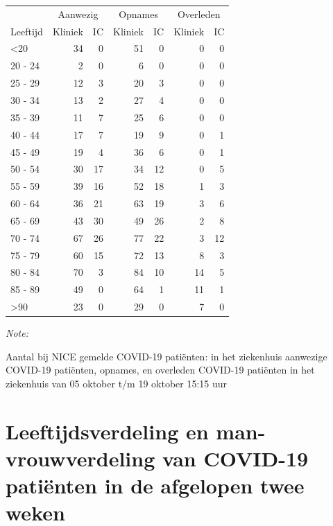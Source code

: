 \documentclass[
  english,
  man,floatsintext]{apa6}
\begin{document}
\begin{table}
\centering\begingroup\fontsize{10}{12}\selectfont

\begin{threeparttable}
\begin{tabular}{lrrrrrr}
\toprule
\multicolumn{1}{c}{ } & \multicolumn{2}{c}{Aanwezig} & \multicolumn{2}{c}{Opnames} & \multicolumn{2}{c}{Overleden} \\
\cmidrule(l{3pt}r{3pt}){2-3} \cmidrule(l{3pt}r{3pt}){4-5} \cmidrule(l{3pt}r{3pt}){6-7}
Leeftijd & Kliniek & IC & Kliniek & IC & Kliniek & IC\\
\midrule
<20 & 34 & 0 & 51 & 0 & 0 & 0\\
20 - 24 & 2 & 0 & 6 & 0 & 0 & 0\\
25 - 29 & 12 & 3 & 20 & 3 & 0 & 0\\
30 - 34 & 13 & 2 & 27 & 4 & 0 & 0\\
35 - 39 & 11 & 7 & 25 & 6 & 0 & 0\\
40 - 44 & 17 & 7 & 19 & 9 & 0 & 1\\
45 - 49 & 19 & 4 & 36 & 6 & 0 & 1\\
50 - 54 & 30 & 17 & 34 & 12 & 0 & 5\\
55 - 59 & 39 & 16 & 52 & 18 & 1 & 3\\
60 - 64 & 36 & 21 & 63 & 19 & 3 & 6\\
65 - 69 & 43 & 30 & 49 & 26 & 2 & 8\\
70 - 74 & 67 & 26 & 77 & 22 & 3 & 12\\
75 - 79 & 60 & 15 & 72 & 13 & 8 & 3\\
80 - 84 & 70 & 3 & 84 & 10 & 14 & 5\\
85 - 89 & 49 & 0 & 64 & 1 & 11 & 1\\
>90 & 23 & 0 & 29 & 0 & 7 & 0\\
\bottomrule
\end{tabular}
\begin{tablenotes}
\item \textit{Note: } 
\item Aantal bij NICE gemelde COVID-19 patiënten: in het ziekenhuis aanwezige COVID-19 patiënten, opnames, en overleden COVID-19 patiënten in het ziekenhuis van 05 oktober t/m 19 oktober 15:15 uur
\end{tablenotes}
\end{threeparttable}
\endgroup{}
\end{table}

\newpage

\hypertarget{leeftijdsverdeling-en-man-vrouwverdeling-van-covid-19-patiuxebnten-in-de-afgelopen-twee-weken}{%
\section{Leeftijdsverdeling en man-vrouwverdeling van COVID-19 patiënten in de afgelopen twee weken}\label{leeftijdsverdeling-en-man-vrouwverdeling-van-covid-19-patiuxebnten-in-de-afgelopen-twee-weken}}
\end{document}
